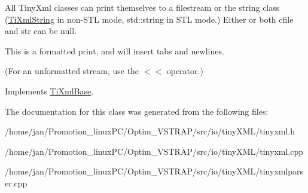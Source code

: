 All Tiny\+Xml classes can print themselves to a filestream or the string class (\hyperlink{classTiXmlString}{Ti\+Xml\+String} in non-\/\+S\+TL mode, std\+::string in S\+TL mode.) Either or both cfile and str can be null.

This is a formatted print, and will insert tabs and newlines.

(For an unformatted stream, use the $<$$<$ operator.) 

Implements \hyperlink{classTiXmlBase_a0de56b3f2ef14c65091a3b916437b512}{Ti\+Xml\+Base}.



The documentation for this class was generated from the following files\+:\begin{DoxyCompactItemize}
\item 
/home/jan/\+Promotion\+\_\+linux\+P\+C/\+Optim\+\_\+\+V\+S\+T\+R\+A\+P/src/io/tiny\+X\+M\+L/tinyxml.\+h\item 
/home/jan/\+Promotion\+\_\+linux\+P\+C/\+Optim\+\_\+\+V\+S\+T\+R\+A\+P/src/io/tiny\+X\+M\+L/tinyxml.\+cpp\item 
/home/jan/\+Promotion\+\_\+linux\+P\+C/\+Optim\+\_\+\+V\+S\+T\+R\+A\+P/src/io/tiny\+X\+M\+L/tinyxmlparser.\+cpp\end{DoxyCompactItemize}
